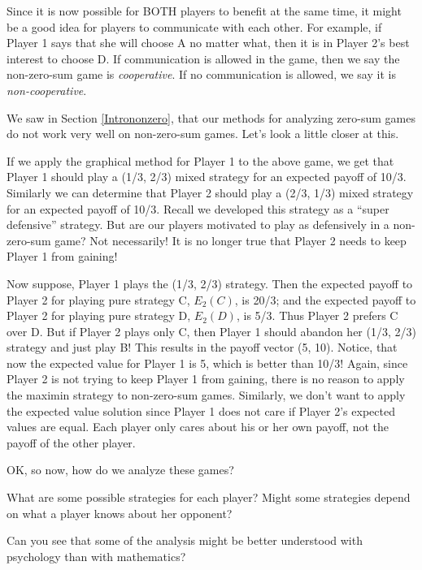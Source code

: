 Since it is now possible for BOTH players to benefit at the same time, it might be a good idea for players to communicate with each other. For example, if Player 1 says that she will choose A no matter what, then it is in Player 2's best interest to choose D. If communication is allowed in the game, then we say the non-zero-sum game is \emph{cooperative}. If no communication is allowed, we say it is \emph{non-cooperative}. 

We saw in Section \ref{Intrononzero}, that our methods for analyzing zero-sum games do not work very well on non-zero-sum games. Let's look a little closer at this. 

If we apply the graphical method for Player 1 to the above game, we get that Player 1 should play a (1/3, 2/3) mixed strategy for an expected payoff of 10/3. Similarly we can determine that Player 2 should play a (2/3, 1/3) mixed strategy for an expected payoff of 10/3. Recall we developed this strategy as a ``super defensive'' strategy. But are our players motivated to play as defensively in a non-zero-sum game? Not necessarily! It is no longer true that Player 2 needs to keep Player 1 from gaining! 

Now suppose, Player 1 plays the (1/3, 2/3) strategy. Then the expected payoff to Player 2 for playing pure strategy C, $E_2(C)$, is 20/3; and the expected payoff to Player 2 for playing pure strategy D, $E_2(D)$, is 5/3. Thus Player 2 prefers C over D. But if Player 2 plays only C, then Player 1 should abandon her (1/3, 2/3) strategy and just play B! This results in the payoff vector (5, 10). Notice, that now the expected value for Player 1 is 5, which is better than 10/3! Again, since Player 2 is not trying to keep Player 1 from gaining, there is no reason to apply the maximin strategy to non-zero-sum games. Similarly, we don't want to apply the expected value solution since Player 1 does not care if Player 2's expected values are equal. Each player only cares about his or her own payoff, not the payoff of the other player.

OK, so now, how do we analyze these games? 

\begin{xca}\label{E:conjgeneralstrat}
What are some possible strategies for each player? Might some strategies depend on what a player knows about her opponent?
\end{xca}

Can you see that some of the analysis might be better understood with psychology than with mathematics? 

